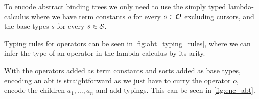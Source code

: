 \documentclass[sigplan]{acmart}
\newcommand{\abt}{\textsf{abt}\xspace}
\begin{document}
To encode abstract binding trees we only need to use the simply typed
lambda-calculus where we have term constants $o$ for every $o \in \mathcal{O}$
excluding cursors, and the base types $s$ for every $s \in \mathcal{S}$.

Typing rules for operators can be seen in \cref{fig:abt_typing_rules},
where we can infer the type of an operator in the lambda-calculus by
its arity.

With the operators added as term constants and sorts added as base
types, encoding an {\abt} is straightforward as we just have to curry the
operator $o$, encode the children $a_1, \dots, a_n$ and add
typings. This can be seen in \cref{fig:enc_abt}.

\end{document}
